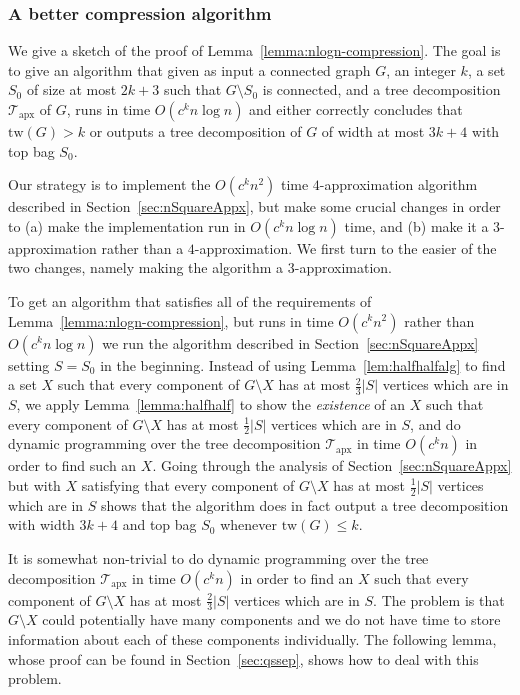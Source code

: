 \documentclass[a4paper,11pt]{article}
\theoremstyle{definition}
\theoremstyle{remark}
\newcommand{\td}{\mathcal{T}} \newcommand{\tw}{\mathrm{tw}} \newcommand{\w}{\mathrm{w}}
\newcommand{\apx}{\textrm{apx}}
\begin{document}
\subsubsection{A better compression algorithm}
\label{sec:proofOfCompress}
We give a sketch of the proof of Lemma~\ref{lemma:nlogn-compression}.
The goal is to give an algorithm that given as input a connected graph
$G$, an integer $k$, a set $S_0$ of size at most $2k+3$ such that
$G\setminus S_0$ is connected, and a tree decomposition $\td_\apx$ of
$G$, runs in time $O(c^kn \log n)$ and either correctly concludes that
$\tw(G) > k$ or outputs a tree decomposition of $G$ of width at most
$3k+4$ with top bag $S_0$.

Our strategy is to implement the $O(c^kn^2)$ time $4$-approximation
algorithm described in Section~\ref{sec:nSquareAppx}, but make some
crucial changes in order to (a) make the implementation run in
$O(c^kn\log n)$ time, and (b) make it a $3$-approximation rather than
a $4$-approximation.  We first turn to the easier of the two changes,
namely making the algorithm a $3$-approximation.

To get an algorithm that satisfies all of the requirements of
Lemma~\ref{lemma:nlogn-compression}, but runs in time $O(c^kn^2)$
rather than $O(c^kn\log n)$ we run the algorithm described in
Section~\ref{sec:nSquareAppx} setting $S = S_0$ in the beginning.
Instead of using Lemma~\ref{lem:halfhalfalg} to find a set $X$ such
that every component of $G \setminus X$ has at most $\frac{2}{3}|S|$
vertices which are in $S$, we apply Lemma~\ref{lemma:halfhalf} to show
the {\em existence} of an $X$ such that every component of $G
\setminus X$ has at most $\frac{1}{2}|S|$ vertices which are in $S$,
and do dynamic programming over the tree decomposition $\td_\apx$ in
time $O(c^kn)$ in order to find such an $X$.  Going through the
analysis of Section~\ref{sec:nSquareAppx} but with $X$ satisfying that
every component of $G \setminus X$ has at most $\frac{1}{2}|S|$
vertices which are in $S$ shows that the algorithm does in fact output
a tree decomposition with width $3k+4$ and top bag $S_0$ whenever
$\tw(G) \leq k$.

It is somewhat non-trivial to do dynamic programming over the tree
decomposition $\td_\apx$ in time $O(c^kn)$ in order to find an $X$
such that every component of $G \setminus X$ has at most
$\frac{2}{3}|S|$ vertices which are in $S$.  The problem is that $G
\setminus X$ could potentially have many components and we do not have
time to store information about each of these components individually.
The following lemma, whose proof can be found in
Section~\ref{sec:qssep}, shows how to deal with this problem.
\end{document}
